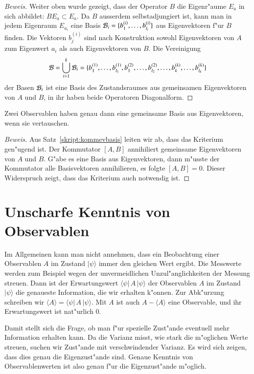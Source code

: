 \begin{proof}[Beweis]
Weiter oben wurde gezeigt, dass der Operator $B$ die Eigenr"aume $E_a$ in sich
abbildet: $BE_a\subset E_a$. Da $B$ ausserdem selbstadjungiert ist, kann man
in jedem Eigenraum $E_{a_i}$ eine Basis
${\cal B}_i= \{b_1^{(i)},\dots,b_{l_i}^{(i)}\}$
aus Eigenvektoren f"ur $B$ finden. Die Vektoren $b_j^{(i)}$ sind nach
Konstruktion sowohl Eigenvektoren von $A$ zum Eigenwert $a_i$ als auch
Eigenvektoren von $B$. Die Vereinigung
\[
{\cal B}
=
\bigcup_{i=1}^k{\cal B}_i
=
\{
b_1^{(1)},\dots,b_{l_1}^{(1)},
b_1^{(2)},\dots,b_{l_2}^{(2)},
\dots,
b_k^{(k)},\dots,b_{l_k}^{(k)}
\}
\]
der Basen ${\cal B}_i$ ist eine Basis des Zustandsraumes aus gemeinsamen
Eigenvektoren von $A$ und $B$, in ihr haben beide Operatoren Diagonalform.
\end{proof}

\begin{satz}
Zwei Observablen haben genau dann eine gemeinsame Basis aus Eigenvektoren,
wenn sie vertauschen.
\end{satz}

\begin{proof}[Beweis]
Aus Satz~\ref{skript:kommevbasis} leiten wir ab, dass das Kriterium
gen"ugend ist.
Der Kommutator $[A,B]$ annihiliert gemeinsame Eigenvektoren von $A$
und $B$.
G"abe es eine Basis aus Eigenvektoren, dann m"usste der Kommutator alle
Basisvektoren annihilieren, es folgte $[A,B]=0$. Dieser
Widerspruch zeigt, dass das Kriterium auch notwendig ist.
\end{proof}


\section{Unscharfe Kenntnis von Observablen}
Im Allgemeinen kann man nicht annehmen, dass ein Beobachtung einer
Observablen $A$ im Zustand $|\psi\rangle$ immer den gleichen Wert ergibt.
Die Messwerte werden zum Beispiel wegen der unvermeidlichen
Unzul"anglichkeiten der Messung streuen.
Dann ist der Erwartungswert $\langle \psi|\,A\,|\psi\rangle$
der Observablen $A$ im Zustand $|\psi\rangle$ die genaueste Information,
die wir erhalten k"onnen.
Zur Abk"urzung schreiben wir $\langle A\rangle=\langle\psi|\,A\,|\psi\rangle$.
Mit $A$ ist auch $A-\langle A\rangle$ eine Observable, und ihr Erwartungswert
ist nat"urlich $0$.

Damit stellt sich die Frage, ob man f"ur spezielle Zust"ande eventuell
mehr Information erhalten kann.
Da die Varianz misst, wie stark die m"oglichen Werte streuen, suchen
wir Zust"ande mit verschwindender Varianz.
Es wird sich zeigen, dass dies genau die Eigenzust"ande sind.
Genaue Kenntnis von Observablenwerten ist also genau f"ur die
Eigenzust"ande m"oglich.

